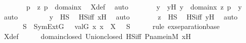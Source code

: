 \begin{isabellebody}
\ \ \ \ \isamarkupfalse%
\ \isamarkupfalse%
\ p\ \ {\isachardoublequoteopen}{\isacharless}{\kern0pt}z{\isacharcomma}{\kern0pt}\ p{\isachargreater}{\kern0pt}\ {\isasymin}\ {\isasymUnion}{\isacharparenleft}{\kern0pt}domain{\isacharparenleft}{\kern0pt}x{\isacharprime}{\kern0pt}{\isacharparenright}{\kern0pt}{\isacharparenright}{\kern0pt}{\isachardoublequoteclose}\ \isamarkupfalse%
\ X{\isacharunderscore}{\kern0pt}def\ \isamarkupfalse%
\ auto\isanewline
\ \ \ \ \isamarkupfalse%
\ \isamarkupfalse%
\ y\ \ yH{\isacharcolon}{\kern0pt}\ {\isachardoublequoteopen}y\ {\isasymin}\ domain{\isacharparenleft}{\kern0pt}x{\isacharprime}{\kern0pt}{\isacharparenright}{\kern0pt}{\isachardoublequoteclose}\ {\isachardoublequoteopen}{\isacharless}{\kern0pt}z{\isacharcomma}{\kern0pt}\ p{\isachargreater}{\kern0pt}\ {\isasymin}\ y{\isachardoublequoteclose}\ \isamarkupfalse%
\ auto\ \isanewline
\ \ \ \ \isamarkupfalse%
\ \isamarkupfalse%
\ {\isachardoublequoteopen}y\ {\isasymin}\ HS{\isachardoublequoteclose}\ \isamarkupfalse%
\ HS{\isacharunderscore}{\kern0pt}iff\ x{\isacharprime}{\kern0pt}H\ \isamarkupfalse%
\ auto\isanewline
\ \ \ \ \isamarkupfalse%
\ \isamarkupfalse%
\ {\isachardoublequoteopen}z\ {\isasymin}\ HS{\isachardoublequoteclose}\ \isamarkupfalse%
\ HS{\isacharunderscore}{\kern0pt}iff\ yH\ \isamarkupfalse%
\ auto\ \isanewline
\ \ \isamarkupfalse%
\isanewline
\ \ \isamarkupfalse%
\ \isamarkupfalse%
\ {\isachardoublequoteopen}{\isasymexists}\ S\ {\isasymin}\ SymExt{\isacharparenleft}{\kern0pt}G{\isacharparenright}{\kern0pt}{\isachardot}{\kern0pt}\ \ {\isacharbraceleft}{\kern0pt}\ val{\isacharparenleft}{\kern0pt}G{\isacharcomma}{\kern0pt}\ x{\isacharparenright}{\kern0pt}{\isachardot}{\kern0pt}\ x\ {\isasymin}\ X\ {\isacharbraceright}{\kern0pt}\ {\isasymsubseteq}\ S{\isachardoublequoteclose}\ \isanewline
\ \ \ \ \isamarkupfalse%
{\isacharparenleft}{\kern0pt}rule\ ex{\isacharunderscore}{\kern0pt}separation{\isacharunderscore}{\kern0pt}base{\isacharparenright}{\kern0pt}\isanewline
\ \ \ \ \isamarkupfalse%
\ X{\isacharunderscore}{\kern0pt}def\isanewline
\ \ \ \ \isamarkupfalse%
\ domain{\isacharunderscore}{\kern0pt}closed\ Union{\isacharunderscore}{\kern0pt}closed\ HS{\isacharunderscore}{\kern0pt}iff\ P{\isacharunderscore}{\kern0pt}name{\isacharunderscore}{\kern0pt}in{\isacharunderscore}{\kern0pt}M\ x{\isacharprime}{\kern0pt}H\ \isanewline

\end{isabellebody}
